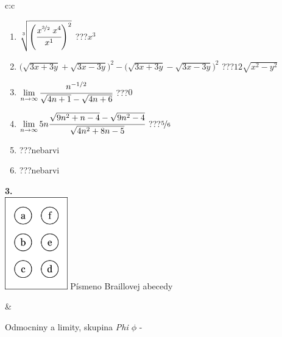 \documentclass[10pt]{report}
\begin{document}
\begin{tabular}{c:c}
\begin{minipage}[c][104.5mm][t]{0.5\linewidth}
\begin{center}
\begin{minipage}{0.79\linewidth}
\begin{center}
\begin{varwidth}{\linewidth}
\begin{enumerate}
\small
\item $\sqrt[3]{\left(\cfrac{x^{\nicefrac{3}{2}}\;x^{4}}{x^{1}}\right)^{2}}$\quad \dotfill\; ???\;\dotfill \quad $x^{3}$
\item {\footnotesize{\scriptsize$\big(\sqrt{3x+3y}+\sqrt{3x-3y}\big)^2-\big(\sqrt{3x+3y}-\sqrt{3x-3y}\big)^2$}\quad \dotfill\; ???\;\dotfill \quad $12\sqrt{x^2-y^2}$}
\item $\lim\limits_{n\to\infty}\cfrac{n^{-1/2}}{\sqrt{4n+1}-\sqrt{4n+6}}$\quad \dotfill\; ???\;\dotfill \quad $0$
\item $\lim\limits_{n\to\infty}5n\cfrac{\sqrt{9n^2+n-4}-\sqrt{9n^2-4}}{\sqrt{4n^2+8n-5}}$\quad \dotfill\; ???\;\dotfill \quad $\nicefrac{5}{6}$
\item \quad \dotfill\; ???\;\dotfill \quad nebarvi
\item \quad \dotfill\; ???\;\dotfill \quad nebarvi
\end{enumerate}
\end{varwidth}
\end{center}
\end{minipage}
\begin{minipage}{0.20\linewidth}
\begin{center}
{\Huge\bfseries 3.} \\[2mm]
\includegraphics[height=40mm]{../images/braille.png}
{\small Písmeno Braillovej abecedy}
\end{center}
\end{minipage}
\end{center}
\end{minipage}
&
\begin{minipage}[c][104.5mm][t]{0.5\linewidth}
\begin{center}
\vspace{7mm}
{\huge Odmocniny a limity, skupina \textit{Phi $\phi$} -}\\[5mm]

\end{center}
\end{minipage}
\end{tabular}
\end{document}
